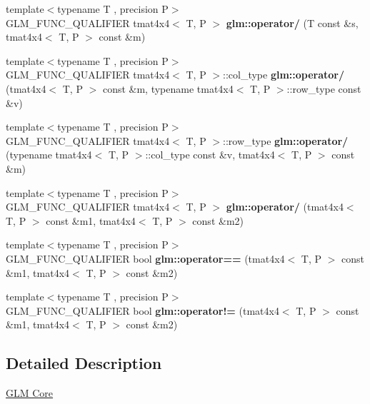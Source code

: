 \begin{DoxyCompactItemize}
\mbox{\label{type__mat4x4_8inl_a061e49063426cd16bad20d2916f281ca}} 
{\footnotesize template$<$typename T , precision P$>$ }\\G\+L\+M\+\_\+\+F\+U\+N\+C\+\_\+\+Q\+U\+A\+L\+I\+F\+I\+ER tmat4x4$<$ T, P $>$ {\bfseries glm\+::operator/} (T const \&s, tmat4x4$<$ T, P $>$ const \&m)
\item 
\mbox{\label{type__mat4x4_8inl_ac86c24a679ceb1c0588e0cd9fa31df3d}} 
{\footnotesize template$<$typename T , precision P$>$ }\\G\+L\+M\+\_\+\+F\+U\+N\+C\+\_\+\+Q\+U\+A\+L\+I\+F\+I\+ER tmat4x4$<$ T, P $>$\+::col\+\_\+type {\bfseries glm\+::operator/} (tmat4x4$<$ T, P $>$ const \&m, typename tmat4x4$<$ T, P $>$\+::row\+\_\+type const \&v)
\item 
\mbox{\label{type__mat4x4_8inl_af41edbb529eca615b9f65e625fae2bab}} 
{\footnotesize template$<$typename T , precision P$>$ }\\G\+L\+M\+\_\+\+F\+U\+N\+C\+\_\+\+Q\+U\+A\+L\+I\+F\+I\+ER tmat4x4$<$ T, P $>$\+::row\+\_\+type {\bfseries glm\+::operator/} (typename tmat4x4$<$ T, P $>$\+::col\+\_\+type const \&v, tmat4x4$<$ T, P $>$ const \&m)
\item 
\mbox{\label{type__mat4x4_8inl_a53cc97cdb468d042fd35bfd46d35fbc0}} 
{\footnotesize template$<$typename T , precision P$>$ }\\G\+L\+M\+\_\+\+F\+U\+N\+C\+\_\+\+Q\+U\+A\+L\+I\+F\+I\+ER tmat4x4$<$ T, P $>$ {\bfseries glm\+::operator/} (tmat4x4$<$ T, P $>$ const \&m1, tmat4x4$<$ T, P $>$ const \&m2)
\item 
\mbox{\label{type__mat4x4_8inl_a4a5a52bd72d27f2659923dcac3a41bd9}} 
{\footnotesize template$<$typename T , precision P$>$ }\\G\+L\+M\+\_\+\+F\+U\+N\+C\+\_\+\+Q\+U\+A\+L\+I\+F\+I\+ER bool {\bfseries glm\+::operator==} (tmat4x4$<$ T, P $>$ const \&m1, tmat4x4$<$ T, P $>$ const \&m2)
\item 
\mbox{\label{type__mat4x4_8inl_a4f307dd12855db67708f7198042f419e}} 
{\footnotesize template$<$typename T , precision P$>$ }\\G\+L\+M\+\_\+\+F\+U\+N\+C\+\_\+\+Q\+U\+A\+L\+I\+F\+I\+ER bool {\bfseries glm\+::operator!=} (tmat4x4$<$ T, P $>$ const \&m1, tmat4x4$<$ T, P $>$ const \&m2)
\end{DoxyCompactItemize}


\subsection{Detailed Description}
\hyperlink{group__core}{G\+LM Core} 